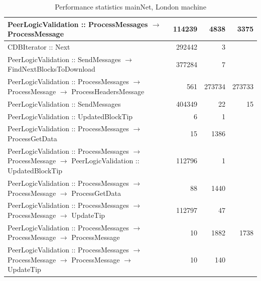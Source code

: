\documentclass{article}
\begin{document}
\begin{table}
\begin{longtable}{P{8cm}|r|r|r}
		PeerLogicValidation :: ProcessMessages $\to$ ProcessMessage& 114239& 4838&3375\\\hline
		CDBIterator :: Next& 292442& 3&\\\hline
		PeerLogicValidation :: SendMessages $\to$ FindNextBlocksToDownload& 377284& 7&\\\hline
		PeerLogicValidation :: ProcessMessages $\to$ ProcessMessage $\to$ ProcessHeadersMessage& 561& 273734&273733\\\hline
		PeerLogicValidation :: SendMessages& 404349& 22&15\\\hline
		PeerLogicValidation :: UpdatedBlockTip& 6& 1&\\\hline
		PeerLogicValidation :: ProcessMessages $\to$ ProcessGetData& 15& 1386&\\\hline
		PeerLogicValidation :: ProcessMessages $\to$ ProcessMessage $\to$ PeerLogicValidation :: UpdatedBlockTip& 112796& 1&\\\hline
		PeerLogicValidation :: ProcessMessages $\to$ ProcessMessage $\to$ ProcessGetData& 88& 1440&\\\hline
		PeerLogicValidation :: ProcessMessages $\to$ ProcessMessage $\to$ UpdateTip& 112797& 47&\\\hline
		PeerLogicValidation :: ProcessMessages $\to$ ProcessMessage $\to$ ProcessMessage& 10& 1882&1738\\\hline
		PeerLogicValidation :: ProcessMessages $\to$ ProcessMessage $\to$ ProcessMessage $\to$ UpdateTip& 10& 140&\\\hline
	\end{longtable}
	\caption{\label{tablePerformanceLondon} Performance statistics mainNet, London machine}
\end{table}
\end{document}
